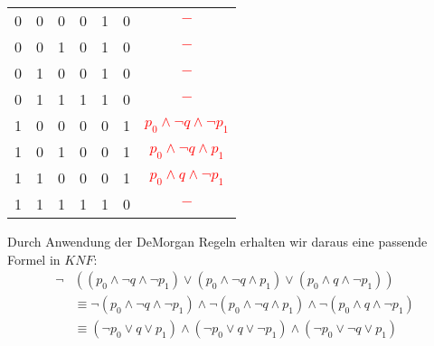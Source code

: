 \begin{bsp}
\begin{center}
\begin{tabular} {| c | c | c || c | c | c | c |}
            \hline
            0 & 0 & 0 & 0 & 1 & 0 & \textcolor{red}{$-$}\\
            0 & 0 & 1 & 0 & 1 & 0 & \textcolor{red}{$-$}\\
            0 & 1 & 0 & 0 & 1 & 0 & \textcolor{red}{$-$}\\
            0 & 1 & 1 & 1 & 1 & 0 & \textcolor{red}{$-$}\\
            1 & 0 & 0 & 0 & 0 & 1 & \textcolor{red}{$p_0 \land \neg q\land \neg p_1$}\\
            1 & 0 & 1 & 0 & 0 & 1 & \textcolor{red}{$p_0 \land \neg q\land      p_1$}\\
            1 & 1 & 0 & 0 & 0 & 1 & \textcolor{red}{$p_0 \land q\land \neg p_1$}\\
            1 & 1 & 1 & 1 & 1 & 0 & \textcolor{red}{$-$}\\
            \hline
        \end{tabular}
    \end{center}
    \smallskip
    Durch Anwendung der DeMorgan Regeln erhalten wir daraus eine passende Formel in $KNF$:
    \begin{align*}
        \neg&((p_0 \land \neg q\land \neg p_1)\lor
              (p_0 \land \neg q\land p_1)\lor
              (p_0 \land q\land \neg p_1)
            )\\
            &\equiv
              \neg(p_0 \land \neg q\land \neg p_1)\land
              \neg(p_0 \land \neg q\land p_1)\land
              \neg(p_0 \land q\land \neg p_1)\\
            &\equiv
              (\neg p_0 \lor q\lor p_1)\land
              (\neg p_0 \lor q\lor \neg p_1)\land
              (\neg p_0 \lor \neg q\lor p_1)
    \end{align*}
\end{bsp}